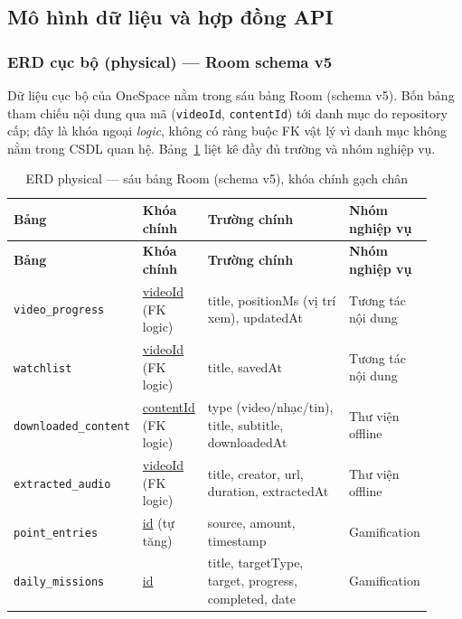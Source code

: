 \subsection{Mô hình dữ liệu và hợp đồng API}
\label{sec:data-api}

\subsubsection{ERD cục bộ (physical) --- Room schema v5}
\label{sec:erd-room}

Dữ liệu cục bộ của OneSpace nằm trong sáu bảng Room (schema v5). Bốn bảng tham chiếu nội dung qua mã (\texttt{videoId}, \texttt{contentId}) tới danh mục do repository cấp; đây là khóa ngoại \emph{logic}, không có ràng buộc FK vật lý vì danh mục không nằm trong CSDL quan hệ. Bảng~\ref{tab:erd-room} liệt kê đầy đủ trường và nhóm nghiệp vụ.

\begingroup
\small
\renewcommand{\arraystretch}{1.15}
\setlength{\tabcolsep}{3pt}
\begin{longtable}{>{\RaggedRight\arraybackslash}p{0.25\linewidth}>{\RaggedRight\arraybackslash}p{0.13\linewidth}>{\RaggedRight\arraybackslash}p{0.39\linewidth}>{\RaggedRight\arraybackslash}p{0.15\linewidth}}
\caption{ERD physical --- sáu bảng Room (schema v5), khóa chính gạch chân}
\label{tab:erd-room}\\
\toprule
\textbf{Bảng} & \textbf{Khóa chính} & \textbf{Trường chính} & \textbf{Nhóm nghiệp vụ} \\
\midrule
\endfirsthead
\toprule
\textbf{Bảng} & \textbf{Khóa chính} & \textbf{Trường chính} & \textbf{Nhóm nghiệp vụ} \\
\midrule
\endhead
\bottomrule
\endfoot
\texttt{video\_progress} & \underline{videoId} (FK logic) & title, positionMs (vị trí xem), updatedAt & Tương tác nội dung \\
\texttt{watchlist} & \underline{videoId} (FK logic) & title, savedAt & Tương tác nội dung \\
\texttt{downloaded\_content} & \underline{contentId} (FK logic) & type (video/nhạc/tin), title, subtitle, downloadedAt & Thư viện offline \\
\texttt{extracted\_audio} & \underline{videoId} (FK logic) & title, creator, url, duration, extractedAt & Thư viện offline \\
\texttt{point\_entries} & \underline{id} (tự tăng) & source, amount, timestamp & Gamification \\
\texttt{daily\_missions} & \underline{id} & title, targetType, target, progress, completed, date & Gamification \\
\end{longtable}
\endgroup

